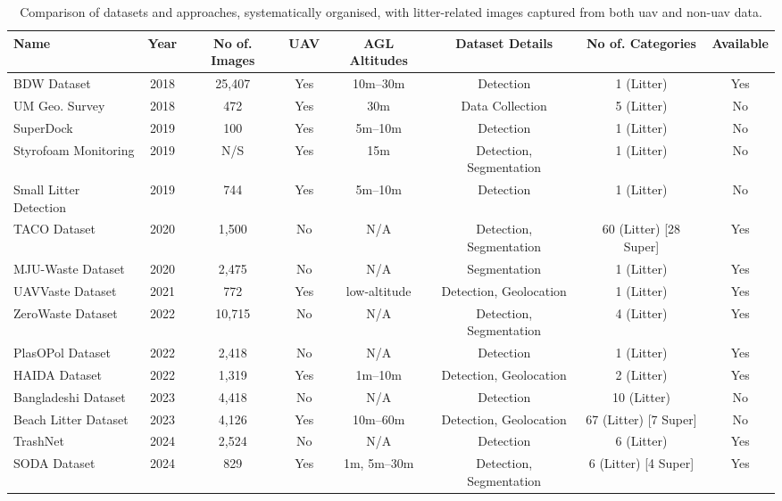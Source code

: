 \begin{table*}[htbp]
\centering
\scriptsize
\begin{adjustbox}{max width=\textwidth, center}
\renewcommand{\arraystretch}{2.0}%
\begin{tabular}{|l|c|c|c|c|c|c|c|}%
\hline
\textbf{Name} & \textbf{Year} & \textbf{No of. Images} & \textbf{UAV}& \textbf{AGL Altitudes} & \textbf{Dataset Details}& \textbf{No of. Categories}  & \textbf{Available}\\ 
\hline \hline
BDW Dataset \cite{bdwdataset} & 2018 & 25,407 & Yes & 10m--30m & Detection & 1 (Litter)  &Yes\\ \hline
UM Geo. Survey \cite{umgeosurvey} & 2018 & 472 & Yes & 30m & Data Collection & 5 (Litter)  &No\\\hline
SuperDock \cite{superdock} & 2019 & 100 & Yes & 5m--10m & Detection & 1 (Litter)  &No\\\hline
Styrofoam Monitoring \cite{styrofoam} & 2019 & N/S\footnotemark[1] & Yes & 15m & Detection, Segmentation & 1 (Litter)  &No\\\hline
Small Litter Detection \cite{small_litter_detection} & 2019 & 744 & Yes & 5m--10m & Detection & 1 (Litter)  &No\\\hline
TACO Dataset \cite{taco2020} & 2020 & 1,500 & No & N/A\footnotemark[2] & Detection, Segmentation & 60 (Litter) [28 Super]  &Yes\\\hline
MJU-Waste Dataset \cite{mju_waste} & 2020 & 2,475 & No & N/A\footnotemark[2] & Segmentation & 1 (Litter)  &Yes\\\hline
UAVVaste Dataset \cite{uavvaste} & 2021 & 772 & Yes & low-altitude & Detection, Geolocation & 1 (Litter)  &Yes\\\hline
ZeroWaste Dataset \cite{zerowaste} & 2022 & 10,715 & No & N/A\footnotemark[2] & Detection, Segmentation & 4 (Litter)  &Yes\\\hline
PlasOPol Dataset \cite{plastopol} & 2022 & 2,418 & No & N/A\footnotemark[2] & Detection & 1 (Litter)  &Yes\\\hline
HAIDA Dataset \cite{haida} & 2022 & 1,319 & Yes & 1m--10m & Detection, Geolocation & 2 (Litter)  &Yes\\\hline
Bangladeshi Dataset \cite{bangladeshi} & 2023 & 4,418 & No & N/A\footnotemark[2] & Detection & 10 (Litter)  &No\\\hline
Beach Litter Dataset \cite{beach_litter} & 2023 & 4,126 & Yes & 10m--60m & Detection, Geolocation & 67 (Litter) [7 Super]  &No\\\hline
TrashNet \cite{trashnet} & 2024 & 2,524 & No & N/A\footnotemark[2] & Detection & 6 (Litter)  &Yes\\\hline
SODA Dataset \cite{soda_dataset} & 2024 & 829 & Yes & 1m, 5m--30m & Detection, Segmentation & 6 (Litter) [4 Super]  &Yes\\\hline
\end{tabular}
\renewcommand{\arraystretch}{1}
\end{adjustbox}
\caption{Comparison of datasets and approaches, systematically organised, with litter-related images captured from both \gls{uav} and non-\gls{uav} data.}
\label{tab:lit_review}
\end{table*}

